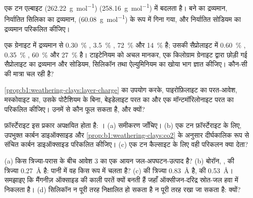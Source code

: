 \begin{exercise}[$\star\star$]
\label{exo:b1:weathering-clays:6}
एक टन एल्बाइट  (\qty{262.22}{g.mol^{-1}})  (\qty{258.16}{g.mol^{-1}}) में बदलता है। बने  का द्रव्यमान, निर्यातित सिलिका का द्रव्यमान,  (\qty{60.08}{g.mol^{-1}}) के रूप में गिना गया, और निर्यातित सोडियम का द्रव्यमान परिकलित कीजिए।
\end{exercise}

\begin{exercise}[$\star\star$]
\label{exo:b1:weathering-clays:7}
एक ग्रेनाइट में द्रव्यमान से \qty{0.30}{\percent} , \qty{3.5}{\percent}
, \qty{72}{\percent}  और \qty{14}{\percent}  है; उसकी सैप्रोलाइट में \qty{0.60}{\percent} , \qty{0.35}{\percent}
, \qty{60}{\percent}  और \qty{27}{\percent}  है। टाइटेनियम को अचल मानकर, एक किलोग्राम ग्रेनाइट द्वारा छोड़ी गई सैप्रोलाइट का द्रव्यमान और सोडियम, सिलिकॉन तथा ऐल्युमिनियम का खोया भाग ज्ञात कीजिए। कौन-सी  की मात्रा चल रही है?
\end{exercise}

\begin{exercise}[$\star\star$]
\label{exo:b1:weathering-clays:8}
\cref{prop:b1:weathering-clays:layer-charge} का उपयोग करके, पाइरोफ़िलाइट  का परत-आवेश,  मस्कोवाइट का, उसके पोटैशियम के बिना, बेइडेलाइट परत  का और एक मॉन्टमॉरिलोनाइट परत  का परिकलित कीजिए। उनमें से कौन फूल सकता है, और क्यों?
\end{exercise}

\begin{exercise}[$\star\star$]
\label{exo:b1:weathering-clays:9}
फ़ॉर्स्टेराइट  इस प्रकार अपक्षयित होता है:
। (a) समीकरण जाँचिए। (b) एक टन फ़ॉर्स्टेराइट के लिए, उपभुक्त कार्बन डाइऑक्साइड और \cref{prop:b1:weathering-clays:co2} के अनुसार दीर्घकालिक रूप से संचित कार्बन डाइऑक्साइड परिकलित कीजिए। (c) एक टन कैल्साइट के लिए वही परिकलन क्या देता?
\end{exercise}

\begin{exercise}[$\star\star\star$]
\label{exo:b1:weathering-clays:10}
(a) किस त्रिज्या-परास के बीच आवेश 3 का एक आयन जल-अपघटन-उत्पाद है? (b) बोरॉन, , की त्रिज्या \qty{0.27}{\angstrom} है: पानी में वह किस रूप में चलता है? (c)  की त्रिज्या \qty{0.83}{\angstrom} है,  की \qty{0.53}{\angstrom}। समझाइए कि मैंगनीज़ ऑक्साइड की काली परतें क्यों बनती हैं जहाँ ऑक्सीजन-दरिद्र स्रोत-जल हवा में निकलता है। (d) सिलिकॉन न पूरी तरह निक्षालित हो सकता है न पूरी तरह रखा जा सकता है: क्यों?
\end{exercise}

